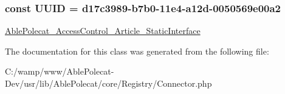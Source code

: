 \subsubsection[{U\+U\+I\+D}]{\setlength{\rightskip}{0pt plus 5cm}const U\+U\+I\+D = \textquotesingle{}d17c3989-\/b7b0-\/11e4-\/a12d-\/0050569e00a2\textquotesingle{}}\label{class_able_polecat___registry___connector_a74b892c8c0b86bf9d04c5819898c51e7}
\hyperlink{interface_able_polecat___access_control___article___static_interface}{Able\+Polecat\+\_\+\+Access\+Control\+\_\+\+Article\+\_\+\+Static\+Interface} 

The documentation for this class was generated from the following file\+:\begin{DoxyCompactItemize}
\item 
C\+:/wamp/www/\+Able\+Polecat-\/\+Dev/usr/lib/\+Able\+Polecat/core/\+Registry/Connector.\+php\end{DoxyCompactItemize}

